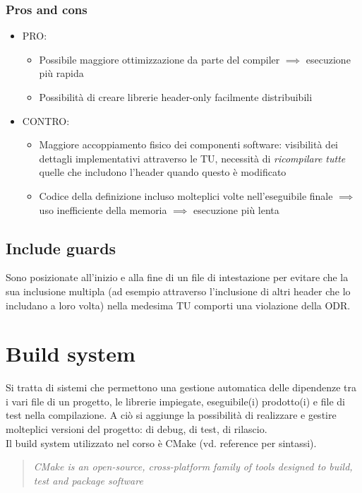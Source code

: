 \documentclass[10pt, oneside]{book}
\begin{document}
\subsubsection{Pros and cons}
\begin{itemize}
\item PRO:
\begin{itemize}
\item Possibile maggiore ottimizzazione da parte del compiler $\implies$ esecuzione più rapida
\item Possibilità di creare librerie header-only facilmente distribuibili
\end{itemize}
\item CONTRO:
\begin{itemize}
\item Maggiore accoppiamento fisico dei componenti software: visibilità dei dettagli implementativi attraverso le TU, necessità di \textit{ricompilare tutte} quelle che includono l'header quando questo è modificato
\item Codice della definizione incluso molteplici volte nell'eseguibile finale $\implies$ uso inefficiente della memoria $\implies$ esecuzione più lenta
\end{itemize}
\end{itemize}

\subsection{Include guards}
Sono posizionate all'inizio e alla fine di un file di intestazione per evitare che la sua inclusione multipla (ad esempio attraverso l'inclusione di altri header che lo includano a loro volta) nella medesima TU comporti una violazione della ODR.

\section{Build system}
Si tratta di sistemi che permettono una gestione automatica delle dipendenze tra i vari file di un progetto, le librerie impiegate, eseguibile(i) prodotto(i) e file di test nella compilazione. A ciò si aggiunge la possibilità di realizzare e gestire molteplici versioni del progetto: di debug, di test, di rilascio.\\
Il build system utilizzato nel corso è CMake (vd. reference per sintassi).
\begin{quote}
\textit{CMake is an open-source, cross-platform family of tools designed
to build, test and package software
}
\end{quote}
\end{document}

